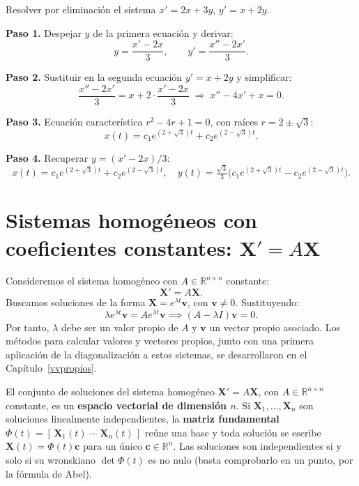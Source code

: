 \begin{example}
Resolver por eliminación el sistema $x'=2x+3y$, $y'=x+2y$.

\begin{myproof}
\textbf{Paso 1.} Despejar $y$ de la primera ecuación y derivar:
\[
y=\frac{x'-2x}{3},\qquad y'=\frac{x''-2x'}{3}.
\]

\textbf{Paso 2.} Sustituir en la segunda ecuación $y'=x+2y$ y simplificar:
\[
\frac{x''-2x'}{3}=x+2\cdot\frac{x'-2x}{3}\;\Longrightarrow\; x''-4x'+x=0.
\]

\textbf{Paso 3.} Ecuación característica $r^2-4r+1=0$, con raíces $r=2\pm\sqrt{3}$:
\[
x(t)=c_1 e^{(2+\sqrt{3})t}+c_2 e^{(2-\sqrt{3})t}.
\]

\textbf{Paso 4.} Recuperar $y=(x'-2x)/3$:
\[
\boxed{x(t)=c_1 e^{(2+\sqrt{3})t}+c_2 e^{(2-\sqrt{3})t},\quad y(t)=\tfrac{\sqrt{3}}{3}\big(c_1 e^{(2+\sqrt{3})t}-c_2 e^{(2-\sqrt{3})t}\big).}
\]
\end{myproof}
\end{example}

\section{Sistemas homogéneos con coeficientes constantes: $\mathbf{X}'=A\mathbf{X}$}

Consideremos el sistema homogéneo con $A\in\mathbb{R}^{n\times n}$ constante:
\[
\mathbf{X}'=A\mathbf{X}.
\]
Buscamos soluciones de la forma $\mathbf{X}=e^{\lambda t}\mathbf{v}$, con $\mathbf{v}\neq 0$. Sustituyendo:
\[
\lambda e^{\lambda t}\mathbf{v}=A e^{\lambda t}\mathbf{v} \implies (A-\lambda I)\mathbf{v}=0.
\]
Por tanto, $\lambda$ debe ser un valor propio de $A$ y $\mathbf{v}$ un vector propio asociado. Los métodos para calcular valores y vectores propios, junto con una primera aplicación de la diagonalización a estos sistemas, se desarrollaron en el Capítulo~\ref{vvpropios}.

\begin{theorem}\label{thm:cap29:estructura}
El conjunto de soluciones del sistema homogéneo $\mathbf{X}'=A\mathbf{X}$, con $A\in\mathbb{R}^{n\times n}$ constante, es un \textbf{espacio vectorial de dimensión $n$}. Si $\mathbf{X}_1,\dots,\mathbf{X}_n$ son soluciones linealmente independientes, la \textbf{matriz fundamental} $\Phi(t)=[\,\mathbf{X}_1(t)\;\cdots\;\mathbf{X}_n(t)\,]$ reúne una base y toda solución se escribe $\mathbf{X}(t)=\Phi(t)\mathbf{c}$ para un único $\mathbf{c}\in\mathbb{R}^n$. Las soluciones son independientes si y solo si su wronskiano $\det\Phi(t)$ es no nulo (basta comprobarlo en un punto, por la fórmula de Abel).
\end{theorem}

